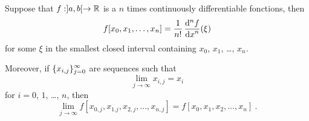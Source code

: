 \begin{prop}
Suppose that $f:]a,b[\rightarrow \mathbb{R}$ is a $n$ times continuously
differentiable fonctions, then
\begin{equation}\label{propA}
f[x_0,x_1,\ldots,x_n] = \frac{1}{n!}\,\displaystyle \frac{\mathrm{d}^{n}{f}} {\displaystyle \mathrm{d}{x}^{n}}(\xi)
\end{equation}
for some $\xi$ in the smallest closed interval containing $x_0$,
$x_1$, \ldots, $x_n$.

Moreover, if $\displaystyle \{x_{i,j}\}_{j=0}^\infty$ are sequences such that
\[
\lim_{j\rightarrow \infty} x_{i,j} = x_i
\]
for $i=0$, $1$, \ldots, $n$, then
\begin{equation}\label{propB}
\lim_{j\rightarrow \infty} f[x_{0,j}, x_{1.j}, x_{2,j}, \ldots, x_{n,j}]
= f[x_0,x_1,x_2,\ldots, x_n] \ .
\end{equation}
\label{prop2_NDDF}
\end{prop}

